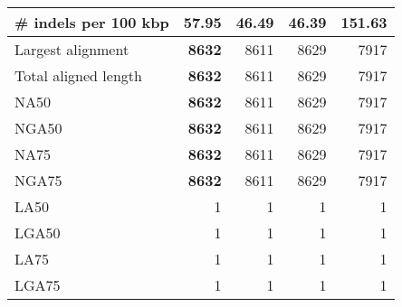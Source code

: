 \documentclass[12pt,a4paper]{article}
\begin{document}
\begin{table}[ht]
\begin{center}
\begin{tabular}{|l*{4}{|r}|}
\# indels per 100 kbp & 57.95 & 46.49 & {\bf 46.39} & 151.63 \\ \hline
Largest alignment & {\bf 8632} & 8611 & 8629 & 7917 \\ \hline
Total aligned length & {\bf 8632} & 8611 & 8629 & 7917 \\ \hline
NA50 & {\bf 8632} & 8611 & 8629 & 7917 \\ \hline
NGA50 & {\bf 8632} & 8611 & 8629 & 7917 \\ \hline
NA75 & {\bf 8632} & 8611 & 8629 & 7917 \\ \hline
NGA75 & {\bf 8632} & 8611 & 8629 & 7917 \\ \hline
LA50 & 1 & 1 & 1 & 1 \\ \hline
LGA50 & 1 & 1 & 1 & 1 \\ \hline
LA75 & 1 & 1 & 1 & 1 \\ \hline
LGA75 & 1 & 1 & 1 & 1 \\ \hline
\end{tabular}
\end{center}
\end{table}
\end{document}
